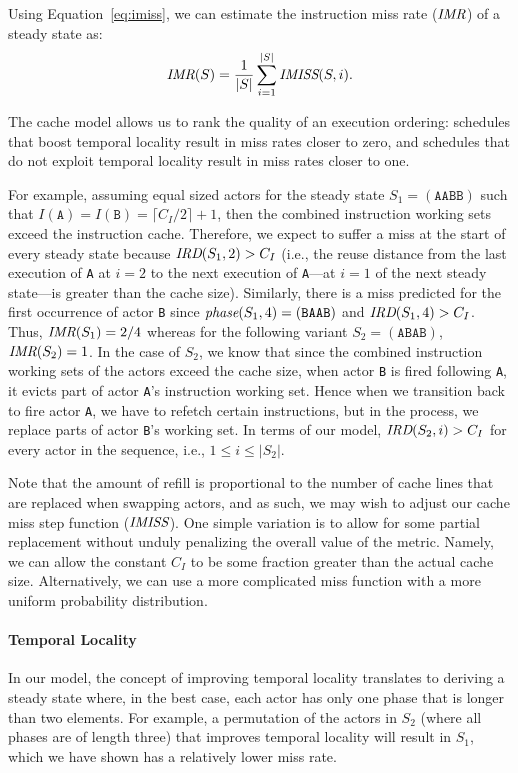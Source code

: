 Using 
Equation~\ref{eq:imiss}, we can estimate the instruction miss
rate ($\mbox{\it IMR}$) of a steady state as: 
\begin{equation}
\label{eq:imr}
  \mbox{\it IMR}(S) = \frac{1}{|S|}\sum_{i=1}^{|S|} \mbox{\it IMISS}(S,i).
\end{equation}

The cache model allows us to rank the quality of an
execution ordering: schedules that boost temporal locality
result in miss rates closer to zero, and schedules that do not
exploit temporal locality result in miss rates closer to one.

For example, assuming equal sized actors for the steady
state $S_1=(\texttt{AABB})$ such that
$I(\texttt{A})=I(\texttt{B})=\lceil{C_I/2}\rceil+1$, then the
combined instruction working 
sets exceed the instruction cache. Therefore, 
we expect to suffer a miss at the start of every
steady state because $\mbox{\it IRD}(S_1, 2)>C_I$ (i.e., the reuse distance
from the last execution of \texttt{A} at $i=2$ to the next execution
of \texttt{A}---at $i=1$ of the next steady state---is greater than the cache
size). Similarly, there is a 
miss predicted for the first occurrence of actor \texttt{B} since
$\mbox{\it phase}(S_1,4)=(\texttt{BAAB})$ and 
$\mbox{\it IRD}(S_1, 4)>C_I$. Thus, $\mbox{\it IMR}(S_1)=2/4$ whereas for the
following variant $S_2=(\texttt{ABAB})$, $\mbox{\it IMR}(S_2)=1$.
In the case of $S_2$, we know that since the combined
instruction working sets of the actors exceed the cache size, when
actor \texttt{B} is fired following \texttt{A}, it evicts part of
actor \texttt{A}'s instruction working set. Hence when we transition
back to fire actor \texttt{A}, we have to refetch certain
instructions, but in the process, we replace parts of actor
\texttt{B}'s working set. In terms of our model, $\mbox{\it IRD}(S_2,i)>C_I$
for every actor in the sequence, i.e., $1\le i\le|S_2|$.

Note that the
amount of refill is proportional to the number of cache lines that are
replaced when swapping actors, and as such, we may wish to adjust
our cache miss step function ($\mbox{\it IMISS}$). One simple variation is to allow for
some partial replacement without unduly penalizing the overall value
of the metric. Namely, we can allow the constant $C_I$ to be some
fraction greater than the actual cache size. Alternatively, we can use
a more complicated miss function with a more uniform probability
distribution.

\paragraph*{Temporal Locality} In our model, the concept of improving
temporal locality translates to deriving a steady state where, in the
best case, each actor has only one phase that is longer than two
elements. For example, a permutation of the actors in $S_2$ (where all
phases are of length three) that improves temporal locality
will result in $S_1$, which we have shown has a relatively lower miss rate.


